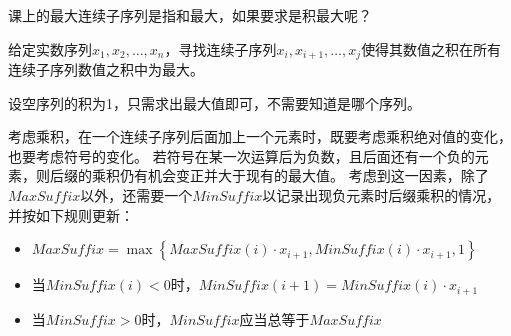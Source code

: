 \begin{questions}
    \question 课上的最大连续子序列是指和最大，如果要求是积最大呢？

    {\kaishu
    给定实数序列$x_1, x_2, \dots, x_n$，寻找连续子序列$x_i, x_{i+1}, \dots, x_j$使得其数值之积在所有连续子序列数值之积中为最大。

    设空序列的积为1，只需求出最大值即可，不需要知道是哪个序列。
    }

    \begin{solution}
        考虑乘积，在一个连续子序列后面加上一个元素时，既要考虑乘积绝对值的变化，也要考虑符号的变化。
        若符号在某一次运算后为负数，且后面还有一个负的元素，则后缀的乘积仍有机会变正并大于现有的最大值。
        考虑到这一因素，除了$MaxSuffix$以外，还需要一个$MinSuffix$以记录出现负元素时后缀乘积的情况，并按如下规则更新：
        \begin{itemize}
            \item $MaxSuffix = \max{\left\{MaxSuffix(i) \cdot x_{i+1}, MinSuffix(i) \cdot x_{i+1}, 1\right\}}$
            \item 当$MinSuffix(i) < 0$时，$MinSuffix(i+1) = MinSuffix(i) \cdot x_{i+1}$
            \item 当$MinSuffix > 0$时，$MinSuffix$应当总等于$MaxSuffix$
        \end{itemize}


\end{solution}
\end{questions}
